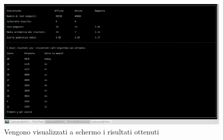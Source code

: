 \begin{figure}[hb]
\center
\includegraphics[width=\textwidth]{immagini/Results.png}
\caption{Vengono visualizzati a schermo i risultati ottenuti}
\end{figure}